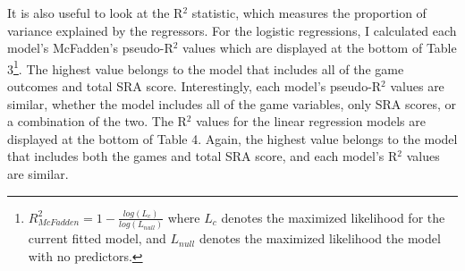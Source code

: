 \documentclass[12pt]{article}
\begin{document}

It is also useful to look at the R$^{2}$ statistic, which measures the proportion of variance explained by the regressors. For the logistic regressions, I calculated each model\rq s McFadden\rq s pseudo-R$^{2}$ values which are displayed at the bottom of Table 3\footnote{
\(R^{2}_{McFadden} = 1 - \frac{log(L_{c})}{log(L_{null})}\)
where \(L_{c}\) denotes the maximized likelihood for the current fitted model, and \(L_{null}\) denotes the maximized likelihood the model with no predictors.
}. The highest value belongs to the model that includes all of the game outcomes and total SRA score. Interestingly, each model\rq s pseudo-R$^{2}$ values are similar, whether the model includes all of the game variables, only SRA scores, or a combination of the two. The R$^{2}$ values for the linear regression models are displayed at the bottom of Table 4. Again, the highest value belongs to the model that includes both the games and total SRA score, and each model\rq s R$^{2}$ values are similar. 
\end{document}
